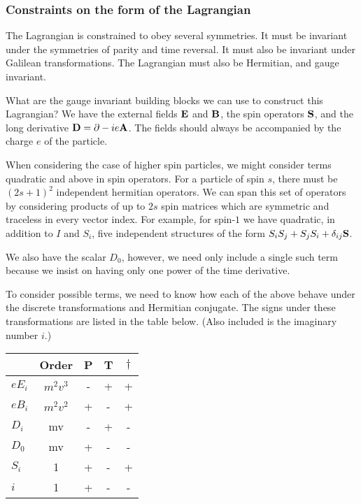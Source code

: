 \subsubsection{Constraints on the form of the Lagrangian}
The Lagrangian is constrained to obey several symmetries.  It must be invariant under the symmetries of parity and time reversal.  It must also be invariant under Galilean transformations.  The Lagrangian must also be Hermitian, and gauge invariant.

What are the gauge invariant building blocks we can use to construct this Lagrangian?  We have the external fields $\mathbf{E}$ and $\mathbf{B}$, the spin operators $\mathbf{S}$, and the long derivative $\mathbf{D} = \mathbf{\partial} - i e\mathbf{A}$.  The fields should always be accompanied by the charge $e$ of the particle.

When considering the case of higher spin particles, we might consider terms quadratic and above in spin operators.  For a particle of spin $s$, there must be $(2s+1)^2$ independent hermitian operators.  We can span this set of operators by considering products of up to $2s$ spin matrices which are symmetric and traceless in every vector index.  For example, for spin-$1$ we have quadratic, in addition to $I$ and $S_i$, five independent structures of the form $ S_i S_j + S_j S_i + \delta_{ij} \mathbf{S}$.




We also have the scalar $D_0$, however, we need only include a single such term because we insist on having only one power of the time derivative.

To consider possible terms, we need to know how each of the above behave under the discrete transformations and Hermitian conjugate.  The signs under these transformations are listed in the table below.  (Also included is the imaginary number $i$.)


\begin{tabular}{l|c|ccc}
& Order	&	P	&	T	&	$\dagger$	\\
\hline
$eE_i$	&$m^2v^3$	&	-	& 	+	&	+		\\
$eB_i$	&$m^2v^2$	&	+	&   -	&	+		\\
$D_i$		& mv	&	-	&	+	&	-		\\
$D_0$		& mv	&	+	&	-	&	-		\\
$S_i$		& 1		&	+	&	-	&	+		\\
$i$		& 1		&	+	&	-	&	-		\\
\end{tabular}

